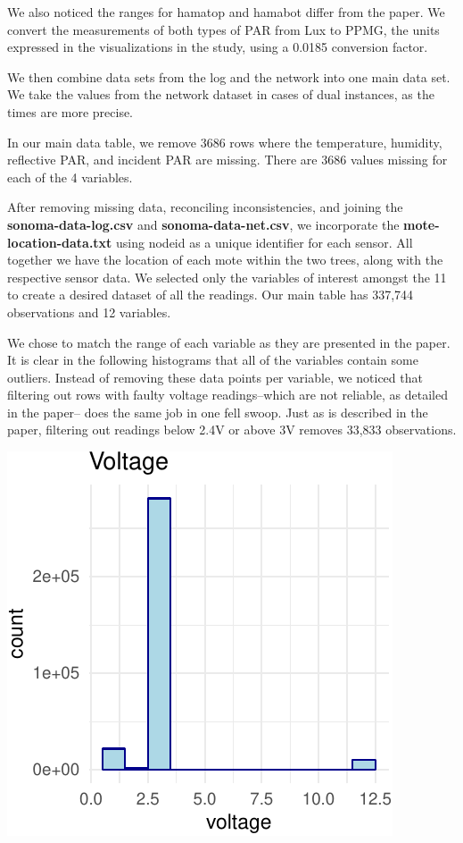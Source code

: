 \documentclass[]{article}
\begin{document}
We also noticed the ranges for hamatop and hamabot differ from the
paper. We convert the measurements of both types of PAR from Lux to
PPMG, the units expressed in the visualizations in the study, using a
0.0185 conversion factor.

We then combine data sets from the log and the network into one main
data set. We take the values from the network dataset in cases of dual
instances, as the times are more precise.

In our main data table, we remove 3686 rows where the temperature,
humidity, reflective PAR, and incident PAR are missing. There are 3686
values missing for each of the 4 variables.

\item

After removing missing data, reconciling inconsistencies, and joining
the \textbf{sonoma-data-log.csv} and \textbf{sonoma-data-net.csv}, we
incorporate the \textbf{mote-location-data.txt} using nodeid as a unique
identifier for each sensor. All together we have the location of each
mote within the two trees, along with the respective sensor data. We
selected only the variables of interest amongst the 11 to create a
desired dataset of all the readings. Our main table has 337,744
observations and 12 variables.

We chose to match the range of each variable as they are presented in
the paper. It is clear in the following histograms that all of the
variables contain some outliers. Instead of removing these data points
per variable, we noticed that filtering out rows with faulty voltage
readings--which are not reliable, as detailed in the paper-- does the
same job in one fell swoop. Just as is described in the paper, filtering
out readings below 2.4V or above 3V removes 33,833 observations.

\begin{center}\includegraphics{Project1WriteUp_files/figure-latex/unnamed-chunk-9-1} \end{center}
\end{document}
